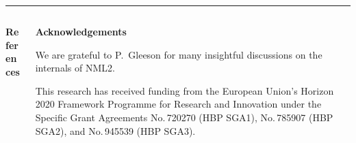\documentclass{beamer}
\begin{document}
\begin{frame}[t, fragile]
  \vspace*{1ex}
  \textcolor{arbgrey}{\rule{\textwidth}{0.5ex}}
  \vspace*{-1ex}
  \begin{columns}
    \begin{column}{0.49\textwidth}
      \textbf{References}
    \end{column}
    \begin{column}{0.49\textwidth}
      \textbf{Acknowledgements}

      We are grateful to P.~Gleeson for many insightful discussions on the
      internals of NML2.

      This research has received funding from the European Union's Horizon 2020
      Framework Programme for Research and Innovation under the Specific Grant
      Agreements No.\,720270 (HBP SGA1), No.\,785907 (HBP SGA2), and No.\,945539
      (HBP SGA3).
    \end{column}
  \end{columns}
\end{frame}
\end{document}
